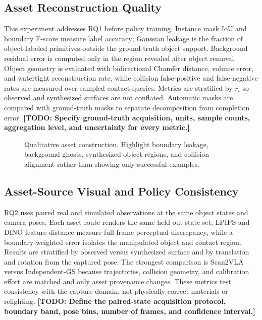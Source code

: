 \documentclass[letterpaper,10pt,conference]{ieeeconf}
\newcommand{\todo}[1]{\textbf{[TODO: #1]}}
\begin{document}
\subsection{Asset Reconstruction Quality}
This experiment addresses RQ1 before policy training. Instance mask IoU and
boundary F-score measure label accuracy; Gaussian leakage is the fraction of
object-labeled primitives outside the ground-truth object support. Background
residual error is computed only in the region revealed after object removal.
Object geometry is evaluated with bidirectional Chamfer distance, volume error,
and watertight reconstruction rate, while collision false-positive and
false-negative rates are measured over sampled contact queries. Metrics are
stratified by $r_i$ so observed and synthesized surfaces are not conflated.
Automatic masks are compared with ground-truth masks to separate decomposition
from completion error. \todo{Specify ground-truth acquisition, units, sample
counts, aggregation level, and uncertainty for every metric.}

\begin{figure}[t]
  \centering
  \caption{Qualitative asset construction. Highlight boundary leakage,
  background ghosts, synthesized object regions, and collision alignment rather
  than showing only successful examples.}
  \label{fig:assets}
\end{figure}

\subsection{Asset-Source Visual and Policy Consistency}
RQ2 uses paired real and simulated observations at the same object states and
camera poses. Each asset route renders the same held-out state set; LPIPS and
DINO feature distance measure full-frame perceptual discrepancy, while a
boundary-weighted error isolates the manipulated object and contact region.
Results are stratified by observed versus synthesized surface and by translation
and rotation from the captured pose. The strongest comparison is Scan2VLA versus
Independent-GS because trajectories, collision geometry, and calibration effort
are matched and only asset provenance changes. These metrics test consistency
with the capture domain, not physically correct materials or relighting.
\todo{Define the paired-state acquisition protocol, boundary band, pose bins,
number of frames, and confidence interval.}
\end{document}
